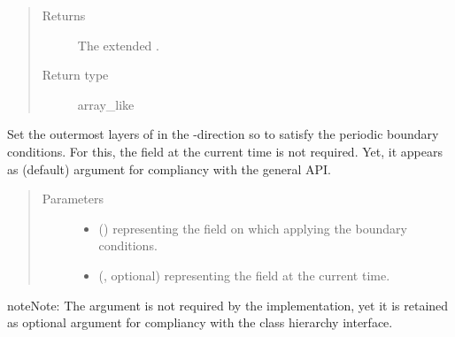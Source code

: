 \documentclass[letterpaper,10pt,english]{sphinxmanual}
\begin{document}
\begin{fulllineitems}
\begin{fulllineitems}
\begin{quote}
\begin{description}
\item[{Returns}] \leavevmode
The extended .

\item[{Return type}] \leavevmode
array\_like

\end{description}\end{quote}

\end{fulllineitems}


\begin{fulllineitems}
\label{\detokenize{api:dycore.horizontal_boundary.PeriodicXZ.set_outermost_layers_x}}
Set the outermost layers of  in the -direction so to satisfy the periodic
boundary conditions. For this, the field  at the current time is not required. Yet,
it appears as (default) argument for compliancy with the general API.
\begin{quote}\begin{description}
\item[{Parameters}] \leavevmode\begin{itemize}
\item {} 
 () \textendash{}  representing the field on which applying the boundary conditions.

\item {} 
 (, optional) \textendash{}  representing the field at the current time.

\end{itemize}

\end{description}\end{quote}

\begin{sphinxadmonition}{note}{Note:}
The argument  is not required by the implementation, yet it is retained as optional
argument for compliancy with the class hierarchy interface.
\end{sphinxadmonition}

\end{fulllineitems}


\end{fulllineitems}
\end{document}
